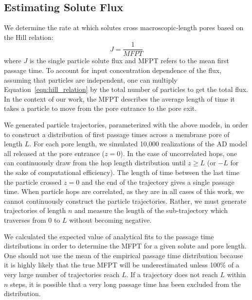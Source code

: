 \documentclass[aps,pre,preprint,groupedaddress,longbibliography]{revtex4-2}
\begin{document}
  \subsection{Estimating Solute Flux}\label{method:mfpt}
  
  We determine the rate at which solutes cross macroscopic-length pores based on the
  Hill relation:~\cite{hill_free_1989}
  \begin{equation}
  J = \frac{1}{MFPT}
  \label{eqn:hill_relation}
  \end{equation}
  where $J$ is the single particle solute flux and MFPT refers to the mean first passage
  time. To account for input concentration dependence of the flux, assuming that particles
  are independent, one can multiply Equation~\ref{eqn:hill_relation} by the total number
  of particles to get the total flux. In the context of our work, the MFPT describes the
  average length of time it takes a particle to move from the pore entrance to the pore exit. 
  
  We generated particle trajectories, parameterized with the above models, in order
  to construct a distribution of first passage times across a membrane pore of length $L$.
  For each pore length, we simulated 10,000 realizations of the AD model
  all released at the pore entrance ($z=0$).
  In the case of uncorrelated hops, one can continuously draw from the hop length 
  distribution until $z \geq L$ (or $-L$ for the sake of computational efficiency). The length of time 
  between the last time the particle crossed $z=0$ and the end of the trajectory gives a 
  single passage time. When particle hops are correlated, as they are in all cases of
  this work, we cannot continuously construct the particle trajectories. Rather, we must
  generate trajectories of length $n$ and measure the length of the sub-trajectory 
  which traverses from $0$ to $L$ without becoming negative.
  
  We calculated the expected value of analytical fits to the passage time distributions
  in order to determine the MFPT for a given solute and pore length. One should not 
  use the mean of the empirical passage time distribution because it is highly likely
  that the true MFPT will be underestimated unless 100\% of a very large number of 
  trajectories reach $L$. If a trajectory does not reach $L$ within $n$ steps, it is
  possible that a very long passage time has been excluded from the distribution.
  
\end{document}
